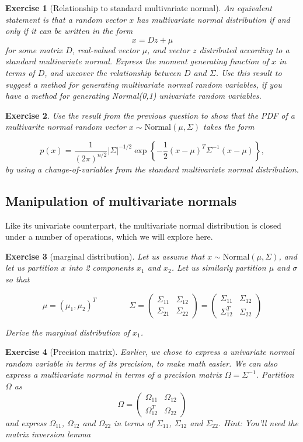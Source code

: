 \documentclass[twoside]{article}
\newcounter{lecnum}
\newtheorem{exercise}{Exercise}[lecnum]
\begin{document}
\begin{exercise}[Relationship to standard multivariate normal]
  An equivalent statement is that a random vector $x$ has multivariate normal distribution if and only if it can be written in the form
  $$x = Dz + \mu$$
  for some matrix $D$, real-valued vector $\mu$, and vector $z$ distributed according to a standard multivariate normal. Express the moment generating function of $x$ in terms of $D$, and uncover the relationship between $D$ and $\Sigma$. Use this result to suggest a method for generating multivariate normal random variables, if you have a method for generating Normal(0,1) univariate random variables.
\end{exercise}

\begin{exercise}
  Use the result from the previous question to show that the PDF of a multivarite normal random vector $x\sim\mbox{Normal}(\mu, \Sigma)$ takes the form

  $$p(x) = \frac{1}{(2\pi)^{n/2}}|\Sigma|^{-1/2}\exp\left\{-\frac{1}{2}(x-\mu)^T\Sigma^{-1}(x-\mu)\right\},$$
by using a change-of-variables from the standard multivariate normal distribution.
\end{exercise}

\subsection{Manipulation of multivariate normals}
Like its univariate counterpart, the multivariate normal distribution is closed under a number of operations, which we will explore here.

\begin{exercise}[marginal distribution]
  Let us assume that $x\sim \mbox{Normal}(\mu, \Sigma)$, and let us partition $x$ into 2 components $x_1$ and $x_2$. Let us similarly partition $\mu$ and $\sigma$ so that

  $$\mu  = (\mu_1, \mu_2)^T \qquad \qquad \Sigma = \begin{pmatrix}\Sigma_{11} & \Sigma_{12} \\ \Sigma_{21} & \Sigma_{22}\end{pmatrix} = \begin{pmatrix}\Sigma_{11} & \Sigma_{12} \\ \Sigma_{12}^T & \Sigma_{22}\end{pmatrix}$$

  Derive the marginal distribution of $x_1$.
\end{exercise}
\begin{exercise}[Precision matrix]
  Earlier, we chose to express a univariate normal random variable in terms of its precision, to make math easier. We can also express a multivariate normal in terms of a precision matrix $\Omega = \Sigma^{-1}$. Partition $\Omega$ as
  $$\Omega = \begin{pmatrix}\Omega_{11} & \Omega_{12} \\ \Omega_{12}^T & \Omega_{22}\end{pmatrix}$$
  and express $\Omega_{11}$, $\Omega_{12}$ and $\Omega_{22}$ in terms of $\Sigma_{11}$, $\Sigma_{12}$ and $\Sigma_{22}$. \textit{Hint: You'll need the matrix inversion lemma}
\end{exercise}
\end{document}

